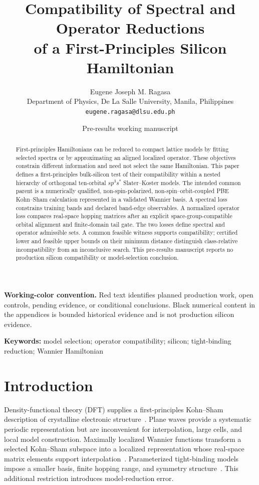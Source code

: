 \documentclass[11pt]{article}
\title{\textbf{Compatibility of Spectral and Operator Reductions\\of a First-Principles Silicon Hamiltonian}}
\author{Eugene Joseph M. Ragasa\\Department of Physics, De La Salle University, Manila, Philippines\\\texttt{eugene.ragasa@dlsu.edu.ph}}
\date{Pre-results working manuscript}
\newenvironment{prospective}{\color{prospectivered}}{}
\begin{document}
\maketitle
\begin{prospective}
\noindent\textbf{Working-color convention.} Red text identifies planned production work,
open controls, pending evidence, or conditional conclusions. Black numerical content in
the appendices is bounded historical evidence and is not production silicon evidence.
\end{prospective}
\begin{prospective}
\begin{abstract}
First-principles Hamiltonians can be reduced to compact lattice models by fitting
selected spectra or by approximating an aligned localized operator. These objectives
constrain different information and need not select the same Hamiltonian. This paper
defines a first-principles bulk-silicon test of their compatibility within a nested
hierarchy of orthogonal ten-orbital $sp^3s^\ast$ Slater--Koster models. The intended
common parent is a numerically qualified, non-spin-polarized, non-spin--orbit-coupled PBE
Kohn--Sham calculation represented in a validated Wannier basis. A spectral loss
constrains training bands and declared band-edge observables. A normalized operator loss
compares real-space hopping matrices after an explicit space-group-compatible orbital
alignment and finite-domain tail gate. The two losses define spectral and operator
admissible sets. A common feasible witness supports compatibility; certified lower and
feasible upper bounds on their minimum distance distinguish class-relative
incompatibility from an inconclusive search. This pre-results manuscript reports no
production silicon compatibility or model-selection conclusion.
\end{abstract}
\noindent\textbf{Keywords:} model selection; operator compatibility; silicon;
tight-binding reduction; Wannier Hamiltonian
\end{prospective}

\section{Introduction}
Density-functional theory (DFT) supplies a first-principles Kohn–Sham description of crystalline electronic structure~\cite{hohenberg1964,kohn1965}. Plane waves provide a systematic periodic representation but are inconvenient for interpolation, large cells, and local model construction. Maximally localized Wannier functions transform a selected Kohn–Sham subspace into a localized representation whose real-space matrix elements support interpolation~\cite{marzari2012,souza2001,pizzi2020,yates2007}. Parameterized tight-binding models impose a smaller basis, finite hopping range, and symmetry structure~\cite{slater1954,vogl1983}. This additional restriction introduces model-reduction error.
\end{document}
